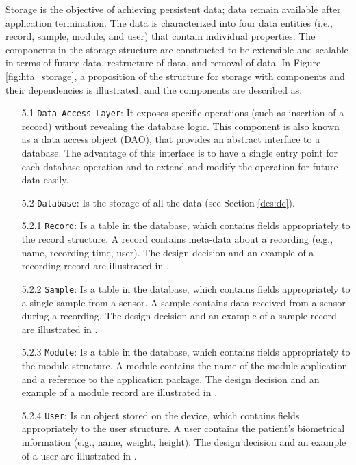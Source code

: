 Storage is the objective of achieving persistent data; data remain available after application termination. The data is characterized into four data entities (i.e., record, sample, module, and user) that contain individual properties.  The components in the storage structure are constructed to be extensible and scalable in terms of future data, restructure of data, and removal of data.  In Figure \ref{fig:hta_storage}, a proposition of the structure for storage with components and their dependencies is illustrated, and the components are described as:

\begin{itemize}
    \item[5.1] \verb|Data Access Layer|: It exposes specific operations (such as insertion of a record) without revealing the database logic. This component is also known as a data access object (DAO), that provides an abstract interface to a database. The advantage of this interface is to have a single entry point for each database operation and to extend and modify the operation for future data easily. 
    \item[5.2] \verb|Database|: Is the storage of all the data (see Section \ref{des:dc}).
    \item[5.2.1] \verb|Record|: Is a table in the database, which contains fields appropriately to the record structure. A record contains meta-data about a recording (e.g., name, recording time, user). The design decision and an example of a recording record are illustrated in .
    \item[5.2.2] \verb|Sample|: Is a table in the database, which contains fields appropriately to a single sample from a sensor. A sample contains data received from a sensor during a recording. The design decision and an example of a sample record are illustrated in .
    \item[5.2.3] \verb|Module|: Is a table in the database, which contains fields appropriately to the module structure. A module contains the name of the module-application and a reference to the application package. The design decision and an example of a module record are illustrated in .
    \item[5.2.4] \verb|User|: Is an object stored on the device, which contains fields appropriately to the user structure. A user contains the patient's biometrical information (e.g., name, weight, height). The design decision and an example of a user are illustrated in .
\end{itemize}

